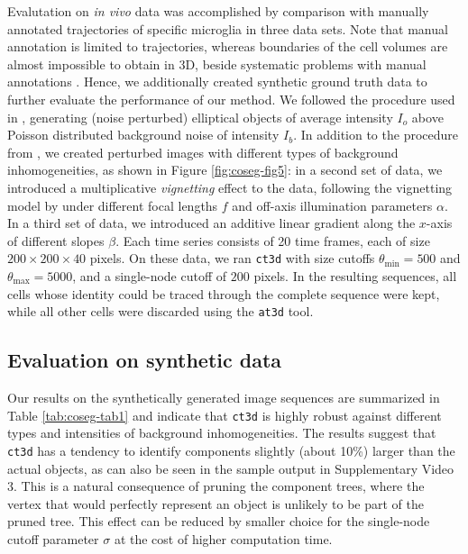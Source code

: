   Evalutation on \textit{in vivo} data was accomplished by comparison
  with manually annotated trajectories of specific microglia in three
  data sets. Note that manual annotation is limited to trajectories,
  whereas boundaries of the cell volumes are almost impossible to
  obtain in 3D, beside systematic problems with manual annotations
  \cite{Huth:10}. Hence, we additionally created synthetic ground
  truth data to further evaluate the performance of our method. We
  followed the procedure used in \cite{dufour2005segmenting}, generating (noise
  perturbed) elliptical objects of average intensity $I_o$ above
  Poisson distributed background noise of intensity $I_b$. In addition
  to the procedure from \cite{dufour2005segmenting}, we created perturbed images
  with different types of background inhomogeneities, as shown in
  Figure \ref{fig:coseg-fig5}: in a second set of data, we
  introduced a multiplicative \emph{vignetting} effect to the data,
  following the vignetting model by \cite{kang2000can} under different
  focal lengths $f$ and off-axis illumination parameters $\alpha$. In
  a third set of data, we introduced an additive linear gradient along
  the $x$-axis of different slopes $\beta$. Each time series consists
  of 20 time frames, each of size $200\times 200\times 40$ pixels. On
  these data, we ran \texttt{ct3d} with size cutoffs
  $\theta_{\min}=500$ and $\theta_{\max}=5000$, and a single-node
  cutoff of $200$ pixels. In the resulting sequences, all cells whose
  identity could be traced through the complete sequence were kept,
  while all other cells were discarded using the \texttt{at3d} tool.


\subsection{Evaluation on synthetic data}

Our results on the synthetically generated image sequences are
summarized in Table \ref{tab:coseg-tab1} and indicate that
\texttt{ct3d} is highly robust against different types and intensities
of background inhomogeneities. The results suggest that \texttt{ct3d}
has a tendency to identify components slightly (about 10\%) larger
than the actual objects, as can also be seen in the sample output in
Supplementary Video 3. This is a natural consequence of pruning the
component trees, where the vertex that would perfectly represent an
object is unlikely to be part of the pruned tree. This effect can be
reduced by smaller choice for the single-node cutoff parameter
$\sigma$ at the cost of higher computation time.


